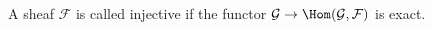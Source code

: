 A sheaf $\mathcal{F}$ is called injective if the functor $\mathcal{G} \to \Hom(\mathcal{G}, \mathcal{F})$ is exact. 